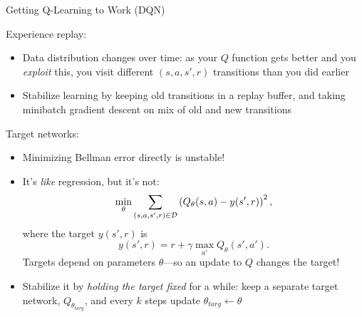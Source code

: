 \documentclass[9pt]{beamer}
\begin{document}
\begin{frame}{Getting Q-Learning to Work (DQN)}

Experience replay:
\begin{itemize}
\item Data distribution changes over time: as your $Q$ function gets better and you \textit{exploit} this, you visit different $(s,a,s',r)$ transitions than you did earlier
\item Stabilize learning by keeping old transitions in a replay buffer, and taking minibatch gradient descent on mix of old and new transitions
\end{itemize}
\pause
Target networks:
\begin{itemize}
\item Minimizing Bellman error directly is unstable! 
\item It's \textit{like} regression, but it's not:
%
\begin{equation*}
\min_{\theta} \sum_{(s,a,s',r)\in {\mathcal D}} \left(Q_{\theta}(s,a) - y(s',r) \right)^2,
\end{equation*}
%
where the target $y(s',r)$ is
%
\begin{equation*}
y(s',r) = r + \gamma \max_{a'} Q_{\theta}(s',a').
\end{equation*}
%
Targets depend on parameters $\theta$---so an update to $Q$ changes the target!
\item Stabilize it by \textit{holding the target fixed} for a while: keep a separate target network, $Q_{\theta_{targ}}$, and every $k$ steps update $\theta_{targ} \leftarrow \theta$
\end{itemize}

\end{frame}
\end{document}
